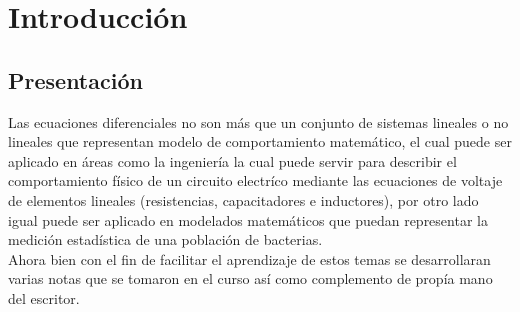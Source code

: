 \documentclass[10pt,executivepaper]{article}
\begin{document}
\begin{center}
	\par{}
	\par{}
	\par{}
	\par\vspace{2cm}{
		Ultima fecha modificado: \today
	}
\end{center}

\clearpage
\tableofcontents
\clearpage

\section{Introducción}
\subsection{Presentación}
Las ecuaciones diferenciales no son más que un conjunto de sistemas lineales o no lineales que representan modelo de comportamiento matemático, el cual puede ser aplicado en áreas como la ingeniería la cual puede servir para describir el comportamiento físico de un circuito electríco mediante las ecuaciones de voltaje de elementos lineales (resistencias, capacitadores e inductores), por otro lado igual puede ser aplicado en modelados matemáticos que puedan representar la medición estadística de una población de bacterias.\\
Ahora bien con el fin de facilitar el aprendizaje de estos temas se desarrollaran varias notas que se tomaron en el curso así como complemento de propía mano del escritor.
\end{document}
